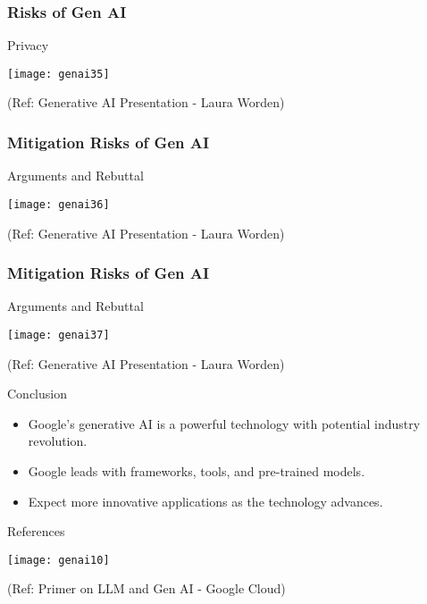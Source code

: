 \begin{frame}[fragile]\frametitle{Risks of Gen AI}

Privacy

\begin{center}
\texttt{[image: genai35]}
\end{center}


{\tiny (Ref: Generative AI Presentation  - Laura Worden)}

\end{frame}

\begin{frame}[fragile]\frametitle{Mitigation Risks of Gen AI}

Arguments and Rebuttal

\begin{center}
\texttt{[image: genai36]}
\end{center}


{\tiny (Ref: Generative AI Presentation  - Laura Worden)}

\end{frame}

\begin{frame}[fragile]\frametitle{Mitigation Risks of Gen AI}

Arguments and Rebuttal

\begin{center}
\texttt{[image: genai37]}
\end{center}


{\tiny (Ref: Generative AI Presentation  - Laura Worden)}

\end{frame}



\begin{frame}[fragile]{Conclusion}
\begin{itemize}
\item Google's generative AI is a powerful technology with potential industry revolution.
\item Google leads with frameworks, tools, and pre-trained models.
\item Expect more innovative applications as the technology advances.
\end{itemize}
\end{frame}

\begin{frame}[fragile]{References}

\begin{center}
\texttt{[image: genai10]}
\end{center}

{\tiny (Ref: Primer on LLM and Gen AI - Google Cloud)}
  
\end{frame}